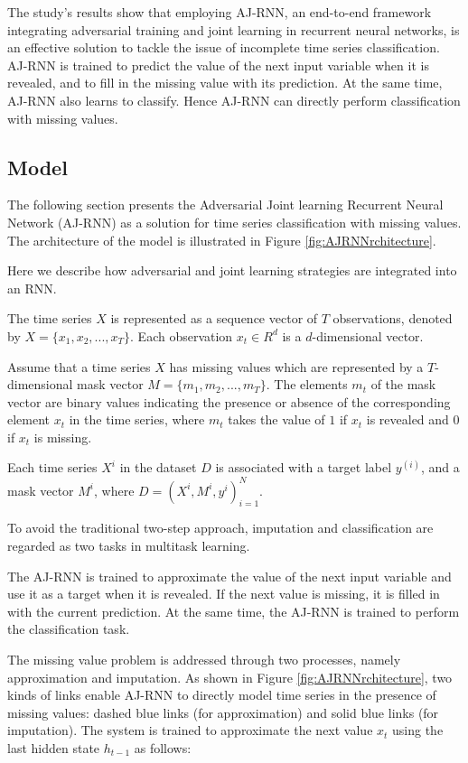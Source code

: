 The study's results show that employing AJ-RNN, an end-to-end framework integrating adversarial training and joint learning in recurrent neural networks, is an effective solution to tackle the issue of incomplete time series classification.
AJ-RNN is trained to predict the value of the next input variable when it is revealed, and to fill in the missing value with its prediction.
At the same time, AJ-RNN also learns to classify.
Hence AJ-RNN can directly perform classification with missing values.

\subsection{Model}


The following section presents the Adversarial Joint learning Recurrent Neural Network (AJ-RNN) as a solution for time series classification with missing values. 
The architecture of the model is illustrated in Figure \ref{fig:AJRNNrchitecture}. 

Here we describe how adversarial and joint learning strategies are integrated into an RNN.


The time series $X$ is represented as a sequence vector of $T$ observations, denoted by $X = \{x_1, x_2, ..., x_T \}$. Each observation $x_t \in R^d$ is a $d$-dimensional vector.

Assume that a time series $X$ has missing values which are represented by a $T$-dimensional mask vector $M = \{m_1, m_2, ..., m_T\}$.
The elements $m_t$ of the mask vector are binary values indicating the presence or absence of the corresponding element $x_t$ in the time series, where $m_t$ takes the value of $1$ if $x_t$ is revealed and $0$ if $x_t$ is missing.

Each time series $X^i$ in the dataset $D$ is associated with a target label $y^{(i)}$, and a mask vector $M^i$, where $D = {(X^i,M^i, y^i)}^N_{i=1}$.

To avoid the traditional two-step approach, imputation and classification are regarded as two tasks in multitask learning.

The AJ-RNN is trained to approximate the value of the next input variable and use it as a target when it is revealed.
If the next value is missing, it is filled in with the current prediction.
At the same time, the AJ-RNN is trained to perform the classification task.

The missing value problem is addressed through two processes, namely approximation and imputation.
As shown in Figure \ref{fig:AJRNNrchitecture}, two kinds of links enable AJ-RNN to directly model time series in the presence of missing values: dashed blue links (for approximation) and solid blue links (for imputation). 
The system is trained to approximate the next value $x_t$ using the last hidden state $h_{t-1}$ as follows:

